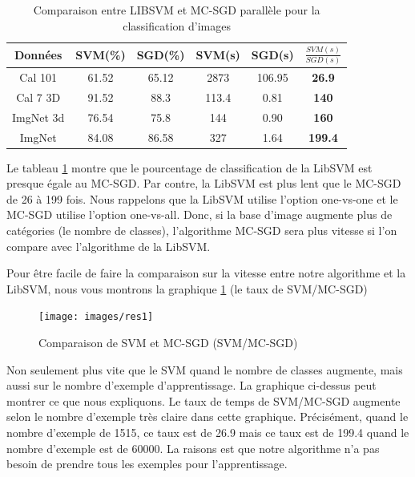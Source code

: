 \begin{table}[h]
\begin{center}
    \begin{tabular}{ | c | c | c | c | c | c |}
    \hline
    Données & SVM(\%) & SGD(\%) & SVM(s) & SGD(s) & $\frac{SVM(s)}{SGD(s)}$ \\ \hline

    Cal 101 & 61.52 & 65.12 & 2873 & 106.95 & \textbf{26.9} \\ \hline
    
    Cal 7 3D & 91.52 & 88.3 & 113.4 & 0.81 & \textbf{140} \\ \hline 

    ImgNet 3d & 76.54 & 75.8 & 144 & 0.90 & \textbf{160} \\ \hline
    
    ImgNet & 84.08 & 86.58 & 327 & 1.64 & \textbf{199.4} \\ \hline
    
    \end{tabular}
\end{center}
\caption{Comparaison entre LIBSVM et MC-SGD parallèle pour la classification d'images}
\label{tab:pimgclasssvm}
\end{table}

Le tableau \ref{tab:pimgclasssvm} montre que le pourcentage de classification de la LibSVM est presque égale au MC-SGD. Par contre, la LibSVM est plus lent que le MC-SGD de 26 à 199 fois. Nous rappelons que la LibSVM utilise l'option one-vs-one et le MC-SGD utilise l'option one-vs-all. Donc, si la base d'image augmente plus de catégories (le nombre de classes), l'algorithme MC-SGD sera plus vitesse si l'on compare avec l'algorithme de la LibSVM.

Pour être facile de faire la comparaison sur la vitesse entre notre algorithme et la LibSVM, nous vous montrons la graphique \ref{fig:res1} (le taux de SVM/MC-SGD)
\begin{figure}[H]
\centering
\texttt{[image: images/res1]}
\caption{Comparaison de SVM et MC-SGD (SVM/MC-SGD)}
\label{fig:res1}
\end{figure}

Non seulement plus vite que le SVM quand le nombre de classes augmente, mais aussi sur le nombre d'exemple d'apprentissage. La graphique ci-dessus peut montrer ce que nous expliquons. Le taux de temps de SVM/MC-SGD augmente selon le nombre d'exemple très claire dans cette graphique. Précisément, quand le nombre d'exemple de 1515, ce taux est de 26.9 mais ce taux est de 199.4 quand le nombre d'exemple est de 60000. La raisons est que notre algorithme n'a pas besoin de prendre tous les exemples pour l'apprentissage.\\
